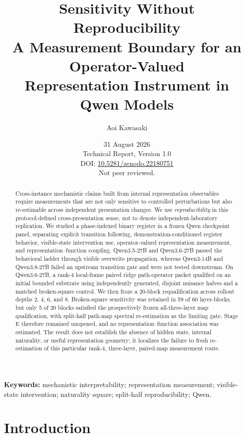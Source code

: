 \documentclass[10pt,a4paper]{article}
\title{\textbf{Sensitivity Without Reproducibility}\\[5pt]
\large A Measurement Boundary for an Operator-Valued\\
Representation Instrument in Qwen Models}
\author{Aoi Kawasaki}
\date{31 August 2026\\[2pt]
\small Technical Report, Version 1.0\\[-1pt]
\small DOI: \href{https://doi.org/10.5281/zenodo.22180751}{10.5281/zenodo.22180751}\\[-1pt]
\small Not peer reviewed.}
\begin{document}
\maketitle

\begin{abstract}
Cross-instance mechanistic claims built from internal representation observables require measurements that are not only sensitive to controlled perturbations but also re-estimable across independent presentation changes. We use \emph{reproducibility} in this protocol-defined cross-presentation sense, not to denote independent-laboratory replication. We studied a phase-indexed binary register in a frozen Qwen checkpoint panel, separating explicit transition following, demonstration-conditioned register behavior, visible-state intervention use, operator-valued representation measurement, and representation--function coupling. Qwen3.5-27B and Qwen3.6-27B passed the behavioral ladder through visible overwrite propagation, whereas Qwen3-14B and Qwen3.8-27B failed an upstream transition gate and were not tested downstream. On Qwen3.6-27B, a rank-4 local-frame paired ridge path-operator packet qualified on an initial bounded substrate using independently generated, disjoint nuisance halves and a matched broken-square control. We then froze a 20-block requalification across rollout depths 2, 4, 6, and 8. Broken-square sensitivity was retained in 59 of 60 layer-blocks, but only 5 of 20 blocks satisfied the prospectively frozen all-three-layer map qualification, with split-half path-map spectral re-estimation as the limiting gate. Stage E therefore remained unopened, and no representation--function association was estimated. The result does not establish the absence of hidden state, internal naturality, or useful representation geometry; it localizes the failure to fresh re-estimation of this particular rank-4, three-layer, paired-map measurement route.
\end{abstract}

\noindent\textbf{Keywords:} mechanistic interpretability; representation measurement; visible-state intervention; naturality square; split-half reproducibility; Qwen.

\section{Introduction}
\label{sec:introduction}
\end{document}
